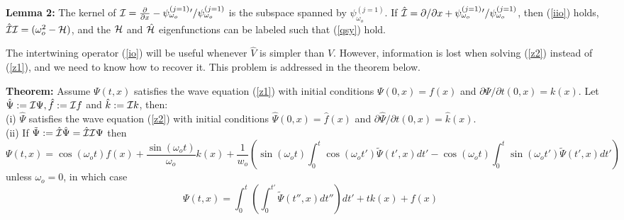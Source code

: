 \documentclass[aps,floats,showpacs,amssymb,tightenlines]{revtex4}
\def\w{\omega}
\def\p{\partial}
\def\I{{\cal I}}
\def\po{\psi_{\w_o}}
\begin{document}
\vspace{.3cm}

\noindent
{\bf Lemma 2:}  The kernel of $\I = \frac{\p}{\p x} - \psi _{\w_o}^{(j=1)} {}' / \psi _{\w_o}^{(j=1)}$
is the subspace spanned by $\po ^{(j=1)}$.  If $ \hat \I  =  \p/\p x +
 \psi _{\w_o}^{(j=1)} {}' / \psi _{\w_o}^{(j=1)}$, then (\ref{iio}) holds,
 $ \hat \I \I = (\w_o^2 - {\cal H})$, and  the ${\cal H}$ and $\hat {\cal H}$ eigenfunctions
can be labeled such that (\ref{qsy}) hold.

\vspace{.3cm}

The intertwining  operator (\ref{io}) will be useful whenever  $\hat V$ is simpler than
$V$. However, information is lost when solving (\ref{z2}) instead of (\ref{z1}), and we need
to know how to recover it. This problem is addressed in the theorem below.

\vspace{.3cm}

\noindent
{\bf Theorem:} Assume $\Psi(t,x)$ satisfies the wave equation (\ref{z1}) with initial conditions $\Psi(0,x)=f(x)$ and $\p \Psi / \p t (0,x)=
k(x)$. Let $\hat \Psi := \I \Psi, \hat f := \I f$ and $\hat k := \I k$, then:\\
(i) $\hat \Psi$ satisfies the wave equation (\ref{z2}) with
initial conditions $\hat \Psi(0,x)=\hat f(x)$ and $\p \hat \Psi / \p t (0,x)= \hat k(x)$. \\
(ii) If $\tilde \Psi := \hat \I \hat \Psi = \hat \I \I \Psi$
then
\begin{equation} \label{sol}
\Psi(t,x) =  \cos (\w_o t) f(x) + \frac{\sin (\w_o t)}{\w_o} k(x) + \frac{1}{w_o} \left(
\sin (\w_o t) \int_0^t \cos (\w_o t') \tilde \Psi(t',x) dt' -\cos (\w_o t) \int_0^t \sin (\w_o t') \tilde \Psi(t',x) dt' \right)
\end{equation}
unless  $\w_o = 0$, in which case
\begin{equation}  \label{sol2}
\Psi(t,x) = \int_0^t \left( \int_0^{t'} \tilde \Psi(t'',x) dt'' \right) dt' + t k(x) + f(x)
\end{equation}

\vspace{.3cm}
\end{document}
